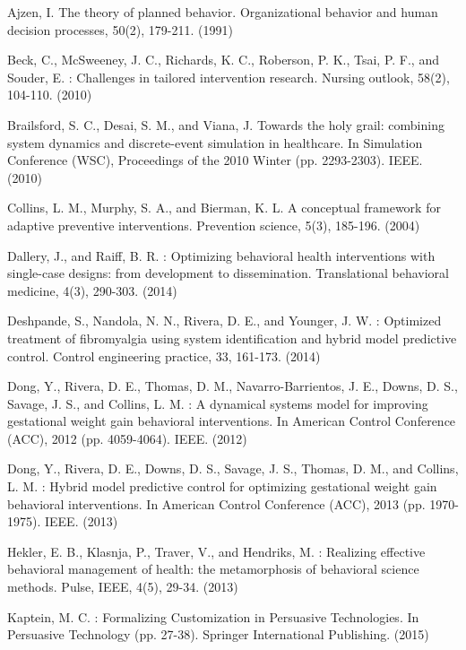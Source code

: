 \documentclass[runningheads,a4paper]{llncs}
\begin{document}
\begin{thebibliography}{4}

 Ajzen, I. The theory of planned behavior. Organizational behavior and human decision processes, 50(2), 179-211. (1991)

 Beck, C., McSweeney, J. C., Richards, K. C., Roberson, P. K., Tsai, P. F., and Souder, E. : Challenges in tailored intervention research. Nursing outlook, 58(2), 104-110. (2010)

 Brailsford, S. C., Desai, S. M., and Viana, J. Towards the holy grail: combining system dynamics and discrete-event simulation in healthcare. In Simulation Conference (WSC), Proceedings of the 2010 Winter (pp. 2293-2303). IEEE. (2010)

 Collins, L. M., Murphy, S. A., and Bierman, K. L. A conceptual framework for adaptive preventive interventions. Prevention science, 5(3), 185-196. (2004)

 Dallery, J., and Raiff, B. R. : Optimizing behavioral health interventions with single-case designs: from development to dissemination. Translational behavioral medicine, 4(3), 290-303. (2014)

 Deshpande, S., Nandola, N. N., Rivera, D. E., and Younger, J. W. : Optimized treatment of fibromyalgia using system identification and hybrid model predictive control. Control engineering practice, 33, 161-173. (2014)

 Dong, Y., Rivera, D. E., Thomas, D. M., Navarro-Barrientos, J. E., Downs, D. S., Savage, J. S., and Collins, L. M. : A dynamical systems model for improving gestational weight gain behavioral interventions. In American Control Conference (ACC), 2012 (pp. 4059-4064). IEEE. (2012)

 Dong, Y., Rivera, D. E., Downs, D. S., Savage, J. S., Thomas, D. M., and Collins, L. M. : Hybrid model predictive control for optimizing gestational weight gain behavioral interventions. In American Control Conference (ACC), 2013 (pp. 1970-1975). IEEE. (2013)

 Hekler, E. B., Klasnja, P., Traver, V., and Hendriks, M. : Realizing effective behavioral management of health: the metamorphosis of behavioral science methods. Pulse, IEEE, 4(5), 29-34. (2013)

 Kaptein, M. C. : Formalizing Customization in Persuasive Technologies. In Persuasive Technology (pp. 27-38). Springer International Publishing. (2015)


\end{thebibliography}
\end{document}
